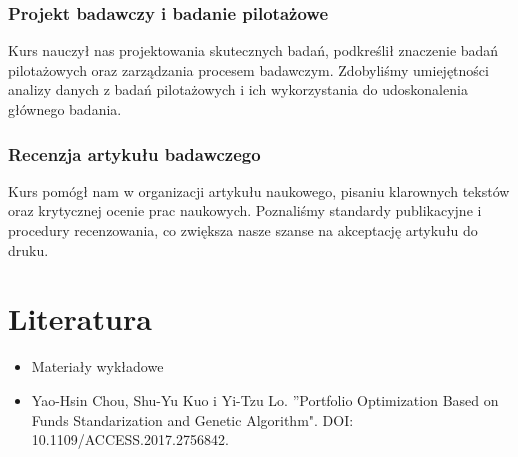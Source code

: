 \documentclass[polish,envcountsect,10pt]{article}
\begin{document}
\subsubsection{Projekt badawczy i badanie pilotażowe}

Kurs nauczył nas projektowania skutecznych badań, podkreślił znaczenie badań pilotażowych oraz zarządzania procesem badawczym. Zdobyliśmy umiejętności analizy danych z badań pilotażowych i ich wykorzystania do udoskonalenia głównego badania.

\subsubsection{Recenzja artykułu badawczego}

Kurs pomógł nam w organizacji artykułu naukowego, pisaniu klarownych tekstów oraz krytycznej ocenie prac naukowych. Poznaliśmy standardy publikacyjne i procedury recenzowania, co zwiększa nasze szanse na akceptację artykułu do druku.

\section{Literatura}

\begin{itemize}
	\item Materiały wykładowe
	\item Yao-Hsin Chou, Shu-Yu Kuo i Yi-Tzu Lo. ''Portfolio Optimization Based on Funds Standarization and Genetic Algorithm". DOI: 10.1109/ACCESS.2017.2756842.
\end{itemize}
\end{document}
